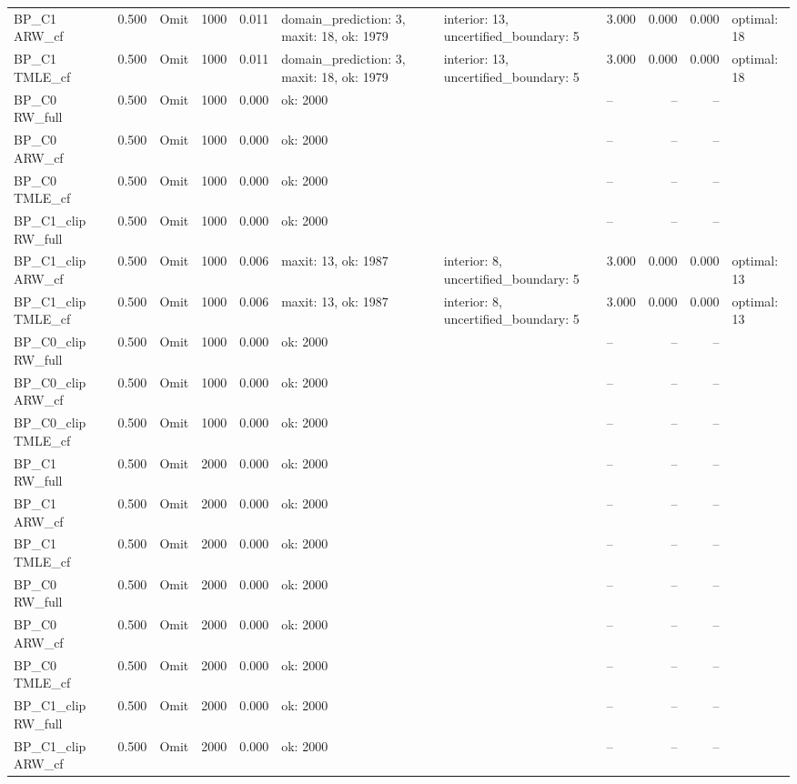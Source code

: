 \begin{tabular}{llllrlllrrl}
BP\_C1 ARW\_cf & 0.500 & Omit & 1000 & 0.011 & domain\_prediction: 3, maxit: 18, ok: 1979 & interior: 13, uncertified\_boundary: 5 & 3.000 & 0.000 & 0.000 & optimal: 18 \\
BP\_C1 TMLE\_cf & 0.500 & Omit & 1000 & 0.011 & domain\_prediction: 3, maxit: 18, ok: 1979 & interior: 13, uncertified\_boundary: 5 & 3.000 & 0.000 & 0.000 & optimal: 18 \\
BP\_C0 RW\_full & 0.500 & Omit & 1000 & 0.000 & ok: 2000 &  & -- & -- & -- &  \\
BP\_C0 ARW\_cf & 0.500 & Omit & 1000 & 0.000 & ok: 2000 &  & -- & -- & -- &  \\
BP\_C0 TMLE\_cf & 0.500 & Omit & 1000 & 0.000 & ok: 2000 &  & -- & -- & -- &  \\
BP\_C1\_clip RW\_full & 0.500 & Omit & 1000 & 0.000 & ok: 2000 &  & -- & -- & -- &  \\
BP\_C1\_clip ARW\_cf & 0.500 & Omit & 1000 & 0.006 & maxit: 13, ok: 1987 & interior: 8, uncertified\_boundary: 5 & 3.000 & 0.000 & 0.000 & optimal: 13 \\
BP\_C1\_clip TMLE\_cf & 0.500 & Omit & 1000 & 0.006 & maxit: 13, ok: 1987 & interior: 8, uncertified\_boundary: 5 & 3.000 & 0.000 & 0.000 & optimal: 13 \\
BP\_C0\_clip RW\_full & 0.500 & Omit & 1000 & 0.000 & ok: 2000 &  & -- & -- & -- &  \\
BP\_C0\_clip ARW\_cf & 0.500 & Omit & 1000 & 0.000 & ok: 2000 &  & -- & -- & -- &  \\
BP\_C0\_clip TMLE\_cf & 0.500 & Omit & 1000 & 0.000 & ok: 2000 &  & -- & -- & -- &  \\
BP\_C1 RW\_full & 0.500 & Omit & 2000 & 0.000 & ok: 2000 &  & -- & -- & -- &  \\
BP\_C1 ARW\_cf & 0.500 & Omit & 2000 & 0.000 & ok: 2000 &  & -- & -- & -- &  \\
BP\_C1 TMLE\_cf & 0.500 & Omit & 2000 & 0.000 & ok: 2000 &  & -- & -- & -- &  \\
BP\_C0 RW\_full & 0.500 & Omit & 2000 & 0.000 & ok: 2000 &  & -- & -- & -- &  \\
BP\_C0 ARW\_cf & 0.500 & Omit & 2000 & 0.000 & ok: 2000 &  & -- & -- & -- &  \\
BP\_C0 TMLE\_cf & 0.500 & Omit & 2000 & 0.000 & ok: 2000 &  & -- & -- & -- &  \\
BP\_C1\_clip RW\_full & 0.500 & Omit & 2000 & 0.000 & ok: 2000 &  & -- & -- & -- &  \\
BP\_C1\_clip ARW\_cf & 0.500 & Omit & 2000 & 0.000 & ok: 2000 &  & -- & -- & -- &  \\

\end{tabular}
